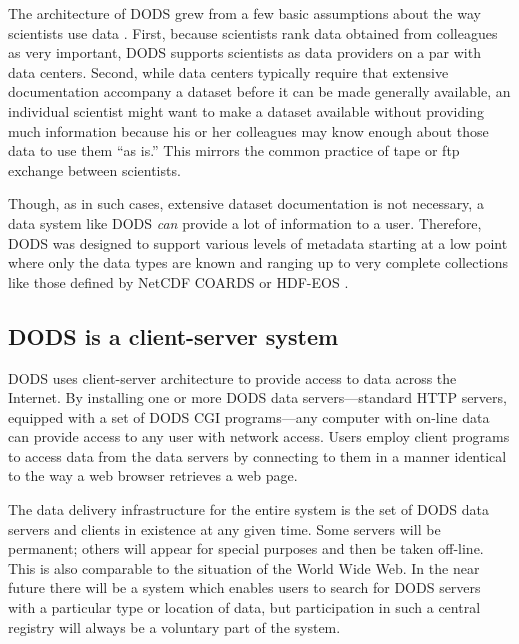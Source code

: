 \documentclass[12pt]{article}
\begin{document}
The architecture of \ac{DODS} grew from a few basic assumptions about the way
scientists use data \cite{dods:workshop1}. First, because scientists rank
data obtained from colleagues as very important, \ac{DODS} supports
scientists as data providers on a par with data centers. Second, while data
centers typically require that extensive documentation accompany a dataset
before it can be made generally available, an individual scientist might want
to make a dataset available without providing much information because his or
her colleagues may know enough about those data to use them ``as is.''  This
mirrors the common practice of tape or ftp exchange between scientists.

Though, as in such cases, extensive dataset documentation is not necessary, a
data system like \ac{DODS} \emph{can} provide a lot of information to a user.
Therefore, \ac{DODS} was designed to support various levels of metadata
starting at a low point where only the data types are known and ranging up to
very complete collections like those defined by \acs{NetCDF} \acs{COARDS}
\cite{netcdf:conventions} or \acs{HDF}-\acs{EOS} \cite{hdfeos}.

\subsection{\ac{DODS} is a client-server system}
\label{cs}

\ac{DODS} uses client-server architecture to provide access to data across
the Internet. By installing one or more \ac{DODS} data servers---standard
\acs{HTTP} servers, equipped with a set of \ac{DODS} \acs{CGI} programs---any
computer with on-line data can provide access to any user with network
access.  Users employ client programs to access data from the data servers by
connecting to them in a manner identical to the way a web browser retrieves a
web page.

The data delivery infrastructure for the entire system is the set of
\ac{DODS} data servers and clients in existence at any given time. Some servers will
be permanent; others will appear for special purposes and then be
taken off-line.  This is also
comparable to the situation of the World Wide Web.  In the near future there
will be a system which enables users to search for \ac{DODS} servers with a
particular type or location of data, but participation in such a central
registry will always be a voluntary part of the system.
\end{document}
